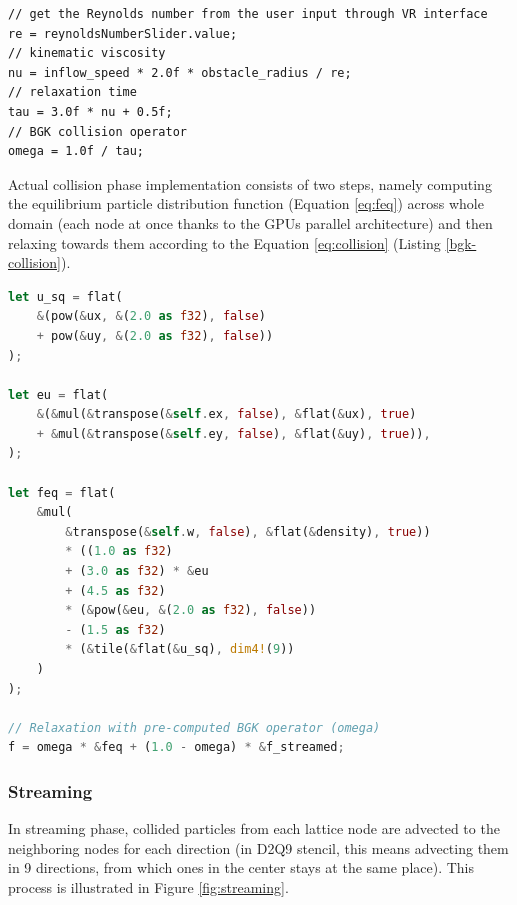 \begin{lstlisting}[language=Csharp, caption=Pseudocode for computing the BGK collision operator\, omega\, on Unity's side., label=omega-computing]
// get the Reynolds number from the user input through VR interface
re = reynoldsNumberSlider.value;
// kinematic viscosity
nu = inflow_speed * 2.0f * obstacle_radius / re;
// relaxation time
tau = 3.0f * nu + 0.5f;
// BGK collision operator
omega = 1.0f / tau;
\end{lstlisting}

Actual collision phase implementation consists of two steps, namely computing the equilibrium particle distribution function (Equation \ref{eq:feq}) across whole domain (each node at once thanks to the GPUs parallel architecture) and then relaxing towards them according to the Equation \ref{eq:collision} (Listing \ref{bgk-collision}).

\begin{lstlisting}[language=Rust, caption=BGK collision phase., label=bgk-collision]
let u_sq = flat(
	&(pow(&ux, &(2.0 as f32), false)
	+ pow(&uy, &(2.0 as f32), false))
);

let eu = flat(
	&(&mul(&transpose(&self.ex, false), &flat(&ux), true)
	+ &mul(&transpose(&self.ey, false), &flat(&uy), true)),
);

let feq = flat(
	&mul(
		&transpose(&self.w, false), &flat(&density), true))
		* ((1.0 as f32)
		+ (3.0 as f32) * &eu
		+ (4.5 as f32)
		* (&pow(&eu, &(2.0 as f32), false))
		- (1.5 as f32)
		* (&tile(&flat(&u_sq), dim4!(9))
	)
);

// Relaxation with pre-computed BGK operator (omega)
f = omega * &feq + (1.0 - omega) * &f_streamed;
\end{lstlisting}


%

\subsubsection{Streaming}\label{sec:streaming}
In streaming phase, collided particles from each lattice node are advected to the neighboring nodes for each direction (in D2Q9 stencil, this means advecting them in 9 directions, from which ones in the center stays at the same place). This process is illustrated in Figure \ref{fig:streaming}. 

